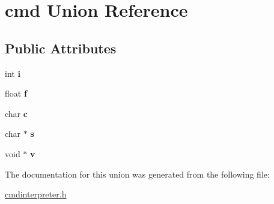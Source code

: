 \hypertarget{unioncmd}{}\section{cmd Union Reference}
\label{unioncmd}
\subsection*{Public Attributes}
\begin{DoxyCompactItemize}
\item 
\mbox{\label{unioncmd_a842e5ae3aef962bcb73735badc6d4bc6}} 
int {\bfseries i}
\item 
\mbox{\label{unioncmd_a04ee534191659527d610d991656c4bef}} 
float {\bfseries f}
\item 
\mbox{\label{unioncmd_a7cf9a2cf54f5e313f767df32b7cb6e9f}} 
char {\bfseries c}
\item 
\mbox{\label{unioncmd_abd4c332561a8876e389edd1209bab60c}} 
char $\ast$ {\bfseries s}
\item 
\mbox{\label{unioncmd_a58c331ffff39e053551eea5bd6fe2ca5}} 
void $\ast$ {\bfseries v}
\end{DoxyCompactItemize}


The documentation for this union was generated from the following file\+:\begin{DoxyCompactItemize}
\item 
\mbox{\hyperlink{cmdinterpreter_8h}{cmdinterpreter.\+h}}\end{DoxyCompactItemize}
